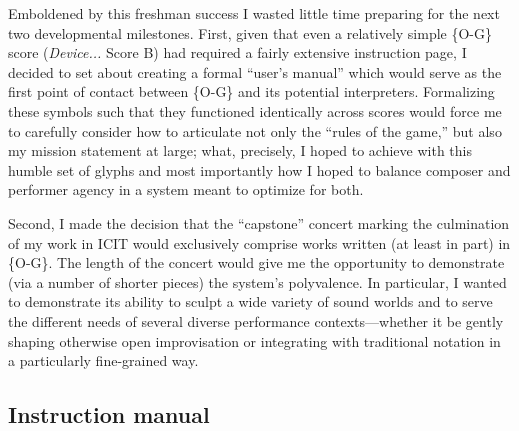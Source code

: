 
    Emboldened by this freshman success I wasted little time preparing for the next two developmental milestones. First, given that even a relatively simple \{O-G\} score (\textit{Device...} Score B) had required a fairly extensive instruction page, I decided to set about creating a formal ``user's manual'' which would serve as the first point of contact between \{O-G\} and its potential interpreters. Formalizing these symbols such that they functioned identically across scores would force me to carefully consider how to articulate not only the ``rules of the game,'' but also my mission statement at large; what, precisely, I hoped to achieve with this humble set of glyphs and most importantly how I hoped to balance composer and performer agency in a system meant to optimize for both.
    
    Second, I made the decision that the ``capstone'' concert marking the culmination of my work in ICIT would exclusively comprise works written (at least in part) in \{O-G\}. The length of the concert would give me the opportunity to demonstrate (via a number of shorter pieces) the system's polyvalence. In particular, I wanted to demonstrate its ability to sculpt a wide variety of sound worlds and to serve the different needs of several diverse performance contexts---whether it be gently shaping otherwise open improvisation or integrating with traditional notation in a particularly fine-grained way. 

    \subsection{Instruction manual}
    \label{sec:instruction-manual}

